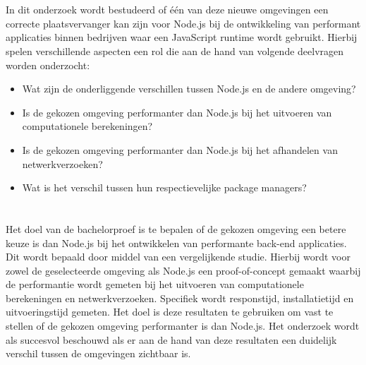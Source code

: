 \section{}%
\label{sec:onderzoeksvraag}

In dit onderzoek wordt bestudeerd of één van deze nieuwe omgevingen
een correcte plaatsvervanger kan zijn voor Node.js bij de ontwikkeling van performant applicaties binnen bedrijven 
waar een JavaScript runtime wordt gebruikt.
Hierbij spelen verschillende aspecten een rol die aan de hand van volgende deelvragen worden onderzocht:
\begin{itemize}
  \item Wat zijn de onderliggende verschillen tussen Node.js en de andere omgeving?
  \item Is de gekozen omgeving performanter dan Node.js bij het uitvoeren van computationele berekeningen?
  \item Is de gekozen omgeving performanter dan Node.js bij het afhandelen van netwerkverzoeken?
  \item Wat is het verschil tussen hun respectievelijke package managers?
\end{itemize}

\section{}%
\label{sec:onderzoeksdoelstelling}


Het doel van de bachelorproef is te bepalen of de gekozen omgeving een betere keuze is dan Node.js bij het
ontwikkelen van performante back-end applicaties. Dit wordt bepaald door middel van een vergelijkende studie.
Hierbij wordt voor zowel de geselecteerde omgeving als Node.js een proof-of-concept gemaakt waarbij de performantie wordt gemeten bij het uitvoeren van computationele berekeningen 
en netwerkverzoeken. Specifiek wordt responstijd, installatietijd en uitvoeringstijd gemeten. 
Het doel is deze resultaten te gebruiken om vast te stellen of de gekozen omgeving performanter is dan Node.js. 
Het onderzoek wordt als succesvol beschouwd als er aan de hand van deze resultaten een duidelijk verschil tussen de omgevingen zichtbaar is.
\section{}%
\label{sec:opzet-bachelorproef}

